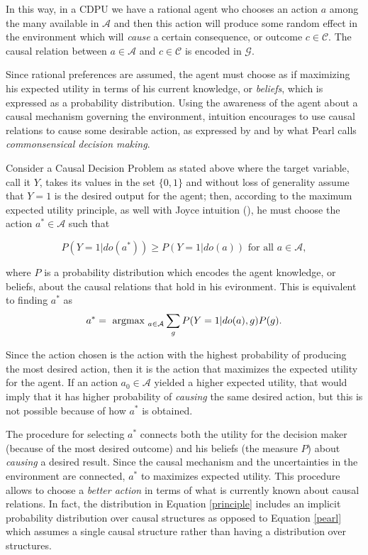 \documentclass[letterpaper]{article}
\begin{document}
In this way, in a CDPU we have a rational agent who chooses an action $a$ among the many available in $\mathcal{A}$ and then this action will produce some random effect in the environment which will \textit{cause} a certain consequence, or outcome $c \in \mathcal{C}$. The causal relation between $a \in \mathcal{A}$ and $c \in \mathcal{C}$ is encoded in $\mathcal{G}$.

Since rational preferences are assumed, the agent must choose as if maximizing his expected utility in terms of his current knowledge, or \textit{beliefs}, which is expressed as a probability distribution. Using the awareness of the agent about a causal mechanism governing the environment, intuition encourages to use causal relations to cause some desirable action, as expressed by \cite{joyce1999foundations} and by what Pearl calls \textit{commonsensical decision making}.

Consider a Causal Decision Problem as stated above where the target variable, call it $Y$, takes its values in the set $\{0,1\}$ and without loss of generality assume that $Y=1$ is the desired output for the agent; then, according to the maximum expected utility principle, as well with Joyce intuition (\cite{joyce1999foundations}), he must choose the action $a^\ast \in \mathcal{A}$ such that

\[ P(Y=1 | do(a^\ast)) \geq P(Y=1 | do(a)) \textrm{ for all } a \in \mathcal{A}, \]

where $P$ is a probability distribution which encodes the agent knowledge, or beliefs, about the causal relations that hold in his evironment. This is equivalent to finding $a^\ast$  as
\begin{equation}{\label{principle}}
 a^\ast = \textrm{ argmax }_{a \in \mathcal{A}}\sum_g P(Y=1 | do(a), g)P(g).
\end{equation}

Since the action chosen is the action with the highest probability of producing the most desired action, then it is the action that maximizes the expected utility for the agent. If an action $a_0 \in \mathcal{A}$ yielded a higher expected utility, that would imply that it has higher probability of \textit{causing} the same desired action, but this is not possible because of how $a^\ast$ is obtained.

The procedure for selecting $a^\ast$ connects both the utility for the decision maker (because of the most desired outcome) and his beliefs (the measure $P$) about \textit{causing} a desired result. Since the causal mechanism and the uncertainties in the environment are connected, $a^\ast$ to maximizes expected utility. This procedure allows to choose a \textit{better action} in terms of what is currently known about causal relations. In fact, the distribution in Equation \ref{principle} includes an implicit probability distribution over causal structures as opposed to Equation \ref{pearl} which assumes a single causal structure rather than having a distribution over structures.
\end{document}
